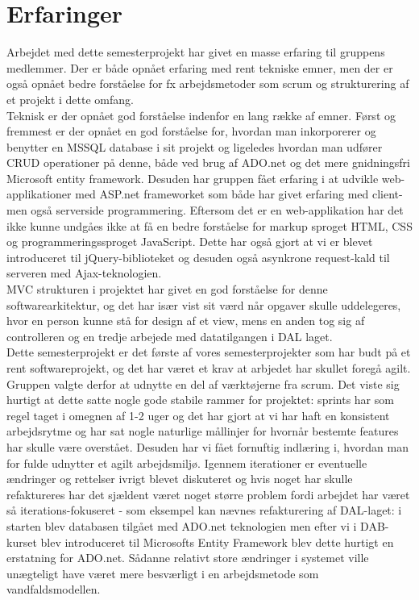 \section{Erfaringer}
Arbejdet med dette semesterprojekt har givet en masse erfaring til gruppens medlemmer. Der er både opnået erfaring med rent tekniske emner, men der er også opnået bedre forståelse for fx arbejdsmetoder som scrum og strukturering af et projekt i dette omfang.\\
Teknisk er der opnået god forståelse indenfor en lang række af emner. Først og fremmest er der opnået en god forståelse for, hvordan man inkorporerer og benytter en MSSQL database i sit projekt og ligeledes hvordan man udfører CRUD operationer på denne, både ved brug af ADO.net og det mere gnidningsfri Microsoft entity framework. Desuden har gruppen fået erfaring i at udvikle web-applikationer med ASP.net frameworket som både har givet erfaring med client- men også serverside programmering. Eftersom det er en web-applikation har det ikke kunne undgåes ikke at få en bedre forståelse for markup sproget HTML, CSS og programmeringssproget JavaScript. Dette har også gjort at vi er blevet introduceret til jQuery-biblioteket og desuden også asynkrone request-kald til serveren med Ajax-teknologien.\\
MVC strukturen i projektet har givet en god forståelse for denne softwarearkitektur, og det har især vist sit værd når opgaver skulle uddelegeres, hvor en person kunne stå for design af et view, mens en anden tog sig af controlleren og en tredje arbejede med datatilgangen i DAL laget. 
\\
Dette semesterprojekt er det første af vores semesterprojekter som har budt på et rent softwareprojekt, og det har været et krav at arbjedet har skullet foregå agilt. Gruppen valgte derfor at udnytte en del af værktøjerne fra scrum. Det viste sig hurtigt at dette satte nogle gode stabile rammer for projektet: sprints har som regel taget i omegnen af 1-2 uger og det har gjort at vi har haft en konsistent arbejdsrytme og har sat nogle naturlige mållinjer for hvornår bestemte features har skulle være overstået. Desuden har vi fået fornuftig indlæring i, hvordan man for fulde udnytter et agilt arbejdsmiljø. Igennem iterationer er eventuelle ændringer og rettelser ivrigt blevet diskuteret og hvis noget har skulle refaktureres har det sjældent været noget større problem fordi arbejdet har været så iterations-fokuseret - som eksempel kan nævnes refakturering af DAL-laget: i starten blev databasen tilgået med ADO.net teknologien men efter vi i DAB-kurset blev introduceret til Microsofts Entity Framework blev dette hurtigt en erstatning for ADO.net. Sådanne relativt store ændringer i systemet ville unægteligt have været mere besværligt i en arbejdsmetode som vandfaldsmodellen. \\

